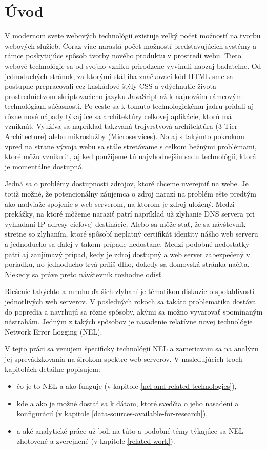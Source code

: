 \chapter{Úvod}
\label{uvod}
\vspace{1cm}

V modernom svete webových technológií existuje veľký počet možností na tvorbu webových služieb. Čoraz viac narastá počet možností predstavujúcich systémy a rámce poskytujúce spôsob tvorby nového produktu v prostredí webu.
Tieto webové technológie sa od svojho vzniku prirodzene vyvinuli naozaj badateľne. 
Od jednoduchých stránok, za ktorými stál iba značkovací kód 
HTML sme sa postupne prepracovali cez kaskádové štýly CSS a vdýchnutie života prostredníctvom skriptovacieho jazyku 
JavaSript až k najnovším rámcovým technológiam súčasnosti. 
Po ceste sa k tomuto technologickému jadru pridali aj rôzne 
nové nápady týkajúce sa architektúry celkovej aplikácie, ktorú má vzniknúť. 
Využíva sa napríklad takzvaná trojvrstvová architektúra (3-Tier Architecture) alebo mikroslužby (Microservices). 
No aj s takýmto pokrokom vpred na strane vývoja webu sa stále stretávame s celkom bežnými problémami, ktoré môžu vzniknúť, aj 
keď použijeme tú najvhodnejšiu sadu technológií, ktorá je momentálne dostupná.

Jedná sa o problémy dostupnosti zdrojov, ktoré chceme uverejniť na webe. 
Je totiž možné, že potencionálny záujemca o zdroj narazí na problém ešte predtým ako nadviaže spojenie s web serverom, na ktorom je zdroj uložený.
Medzi prekážky, na ktoré môžeme naraziť patrí napríklad už zlyhanie DNS servera pri vyhľadaní IP adresy cieľovej destinácie. Alebo sa môže stať, že sa návštevník 
stretne so zlyhaním, ktoré spôsobí neplatný certifikát identity nášho web serveru a jednoducho sa ďalej v takom prípade 
nedostane. 
Medzi podobné nedostatky patrí aj zaujímavý prípad, kedy je zdroj dostupný a web server zabezpečený v poriadku, no jednoducho trvá príliš dlho, dokedy sa domovská stránka načíta. Niekedy sa práve preto návštevník rozhodne odísť.

Riešenie takýchto a mnoho ďalších zlyhaní je tématikou diskuzie o spoľahlivosti jednotlivých web serverov. V posledných rokoch sa takáto problematika dostáva do popredia a navrhujú sa rôzne 
spôsoby, akými sa možno vyvarovať spomínaným nástrahám. Jedným z takých spôsobov je nasadenie relatívne novej 
technológie Network Error Logging (NEL).

\pagebreak

V tejto práci sa venujem špecificky technológií NEL a zameriavam sa na analýzu jej sprevádzkovania na širokom spektre web serverov. 
V nasledujúcich troch kapitolách detailne popisujem:
\begin{itemize}
    \item čo je to NEL a ako funguje (v kapitole \ref{nel-and-related-technologies}),
    \item kde a ako je možné dostať sa k dátam, ktoré svedčia o jeho nasadení a 
konfigurácií (v kapitole \ref{data-sources-available-for-research}),
    \item a aké analytické práce už boli na túto a podobné témy
týkajúce sa NEL zhotovené a zverejnené (v kapitole \ref{related-work}).
\end{itemize}

